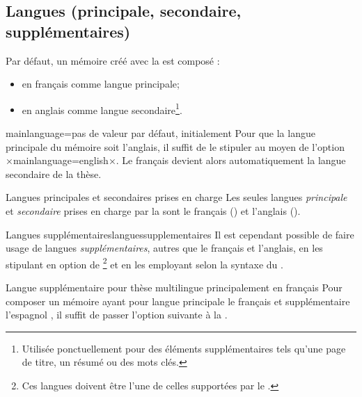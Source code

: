 %

\subsection{Langues (principale, secondaire,
  supplémentaires)}\label{sec:langues}

Par défaut, un mémoire créé avec la \yatcl est composé :
\begin{itemize}
\item en français comme langue principale;
\item en anglais comme langue secondaire\footnote{Utilisée ponctuellement pour
    des éléments supplémentaires tels qu'une page de titre, un résumé ou des
    mots clés.}.
\end{itemize}
%
\begin{docKey}{mainlanguage}{=\textbar{}}{pas
    de valeur par défaut, initialement }
  Pour que la langue principale  du mémoire soit
  l'anglais, il suffit de le stipuler au moyen de l'option
  ×mainlanguage=english×. Le français devient alors automatiquement la langue
  secondaire de la thèse.
\end{docKey}

\begin{dbwarning}{Langues principales et secondaires prises en charge}{}
  Les seules langues \emph{principale} et \emph{secondaire} prises en charge
  par la \yatcl sont le français () et l'anglais
  ().
\end{dbwarning}

\begin{dbremark}{Langues supplémentaires}{languessupplementaires}
  Il est cependant possible de faire usage de langues \emph{supplémentaires},
  autres que le français et l'anglais, en les stipulant en option de
  \footnote{Ces langues doivent être l'une de
    celles supportées par le .} et en les employant selon la
  syntaxe du .
\end{dbremark}

\begin{dbexample}{Langue supplémentaire pour thèse
    multilingue principalement en français}{}
  Pour composer un mémoire ayant pour langue principale le français et
  supplémentaire l'espagnol , il suffit de passer l'option suivante à la \yatcl{}.
\end{dbexample}

